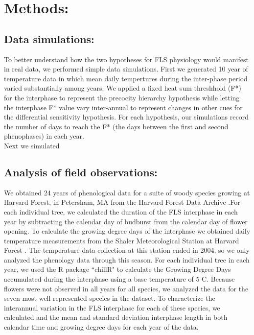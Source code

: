 \documentclass[11pt]{article}
\begin{document}
\section{Methods:}
\subsection*{Data simulations:}
\noindent To better understand how the two hypotheses for FLS physiology would manifest in real data, we performed simple data simulations. First we generated 10 year of temperature data in which mean daily tempertures during the inter-phase period varied substantially among years. We applied a fixed heat sum threshhold (F*) for the interphase to represent the precocity hierarchy hypothesis while letting the interphase F* value vary inter-annual to represent changes in other cues for the differential sensitivity hypothesis. For each hypothesis, our simulations record the number of days to reach the F* (the days between the first and second phenophases) in each year.\\

\noindent Next we simulated

\subsection*{Analysis of field observations:}
\noindent We obtained 24 years of phenological data for a suite of woody species growing at Harvard Forest, in Petersham, MA \citep{Okeefe2015} from the Harvard Forest Data Archive \citep{OKeefe2015}.For each individual tree, we calculated the duration of the FLS interphase in each year by subtracting the calendar day of budburst from the calendar day of flower opening. To calculate the growing degree days of the interphase we obtained daily temperature measurements from the Shaler Meteorological Station at Harvard Forest \citep{}. The temperature data collection at this station ended in 2004, so we only analyzed the phenology data through this season. For each individual tree in each year, we used the R package ``chillR" \citep{} to calculate the Growing Degree Days accumulated during the interphase using a base temperature of 5 \degree C. Because flowers were not observed in all years for all species, we analyzed the data for the seven most well represented species in the dataset. To characterize the interannual variation in the FLS interphase for each of these species, we calculated and the mean and standard deviation interphase length in both calendar time and growing degree days for each year of the data.
\end{document}
